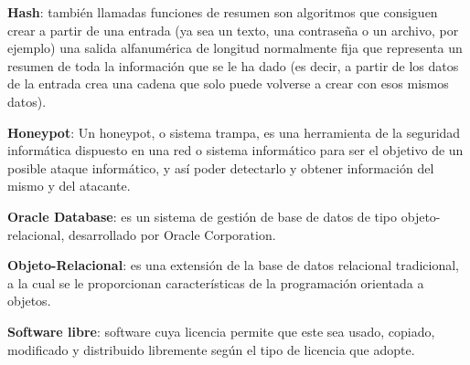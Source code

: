 \textbf{Hash}: también llamadas funciones de resumen son algoritmos que consiguen crear a partir de una entrada (ya sea un texto, una contraseña o un archivo, por ejemplo) una salida alfanumérica de longitud normalmente fija que representa un resumen de toda la información que se le ha dado (es decir, a partir de los datos de la entrada crea una cadena que solo puede volverse a crear con esos mismos datos).
\bigskip

\textbf{Honeypot}: Un honeypot, o sistema trampa, es una herramienta de la seguridad informática dispuesto en una red o sistema informático para ser el objetivo de un posible ataque informático, y así poder detectarlo y obtener información del mismo y del atacante.
\bigskip

\textbf{Oracle Database}: es un sistema de gestión de base de datos de tipo objeto-relacional, desarrollado por Oracle Corporation.
\bigskip

 \textbf{Objeto-Relacional}: es una extensión de la base de datos relacional tradicional, a la cual se le proporcionan características de la programación orientada a objetos.
\bigskip

\textbf{Software libre}: software cuya licencia permite que este sea usado, copiado, modificado y distribuido libremente según el tipo de licencia que adopte.
\bigskip
